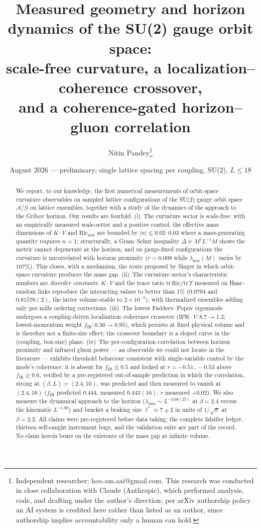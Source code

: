 \documentclass[11pt]{article}
\title{Measured geometry and horizon dynamics of the SU(2) gauge orbit space:\\
scale-free curvature, a localization--coherence crossover,\\
and a coherence-gated horizon--gluon correlation}
\author{Nitin Pandey\thanks{Independent researcher; hoo.am.aai@gmail.com. This research was conducted in close collaboration with Claude (Anthropic), which performed analysis, code, and drafting under the author's direction; per arXiv authorship policy an AI system is credited here rather than listed as an author, since authorship implies accountability only a human can hold.}}
\date{August 2026 --- preliminary; single lattice spacing per coupling, SU(2), $L\le 18$}
\begin{document}
\maketitle

\begin{abstract}
We report, to our knowledge, the first numerical measurements of orbit-space curvature observables on sampled lattice configurations of the
SU(2) gauge orbit space $\mathcal{A}/\mathcal{G}$ on lattice ensembles, together with a
study of the dynamics of the approach to the Gribov horizon. Our results are fourfold.
(i)~The curvature sector is scale-free: with an empirically measured scale-setter and a
positive control, the effective mass dimensions of $K\!\cdot\!V$ and $\mathrm{Ric}_{\min}$
are bounded by $|n|\lesssim 0.02$--$0.03$ where a mass-generating quantity requires
$n=1$; structurally, a Gram--Schur inequality $\Delta \succeq M^{\dagger}L^{-1}M$ shows the
metric cannot degenerate at the horizon, and on gauge-fixed configurations the curvature is
uncorrelated with horizon proximity ($r=0.009$ while $\lambda_{\min}(M)$ varies by $167\%$).
This closes, with a mechanism, the route proposed by Singer in which orbit-space curvature
produces the mass gap. (ii)~The curvature sector's characteristic numbers are
\emph{disorder constants}: $K\!\cdot\!V$ and the trace ratio
$\mathrm{tr}\,\mathrm{Ric}/\mathrm{tr}\,T$ measured on Haar-random links reproduce the
interacting values to better than $1\%$ ($0.0794$ and $0.81576(2)$, the latter
volume-stable to $2\times10^{-5}$), with thermalized ensembles adding only per-mille
ordering corrections. (iii)~The lowest Faddeev--Popov eigenmode undergoes a
coupling-driven localization--coherence crossover ($\mathrm{IPR}\!\cdot\!V:8.7\to1.2$;
lowest-momentum weight $f_{\mathrm{IR}}:0.36\to0.95$), which persists at fixed physical
volume and is therefore not a finite-size effect; the crossover boundary is a sloped curve
in the (coupling, box-size) plane. (iv)~The per-configuration correlation between horizon
proximity and infrared gluon power --- an observable we could not locate in the literature
--- exhibits threshold behaviour consistent with single-variable control by the mode's coherence: it is absent for $f_{\mathrm{IR}}\lesssim0.5$ and locked
at $r=-0.51..-0.53$ above $f_{\mathrm{IR}}\gtrsim0.6$, verified by a pre-registered
out-of-sample prediction in which the correlation, strong at $(\beta,L)=(2.4,10)$, was
predicted and then measured to vanish at $(2.4,16)$ ($f_{\mathrm{IR}}$ predicted $0.444$,
measured $0.443(16)$; $r$ measured $+0.02$). We also measure the dynamical approach to the
horizon ($\lambda_{\min}\sim L^{-3.08(25)}$ at $\beta=2.4$ versus the kinematic
$L^{-1.90}$) and bracket a braking size $\ell^{*}\approx 7\pm2$ in units of
$1/\sqrt{\sigma}$ at $\beta=2.2$. All claims were pre-registered before data taking; the
complete falsifier ledger, thirteen self-caught instrument bugs, and the validation suite
are part of the record. No claim herein bears on the existence of the mass gap at infinite
volume.
\end{abstract}
\end{document}
